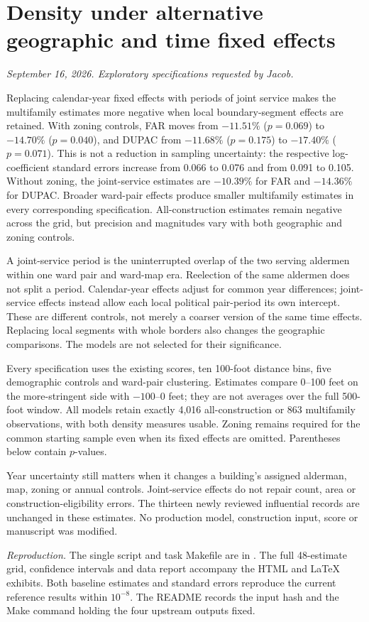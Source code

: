 \clearpage
\section*{Density under alternative geographic and time fixed effects}
\textit{September 16, 2026. Exploratory specifications requested by Jacob.}

Replacing calendar-year fixed effects with periods of joint service makes
the multifamily estimates more negative when local boundary-segment effects
are retained. With zoning controls, FAR moves from $-11.51\%$ ($p=0.069$)
to $-14.70\%$ ($p=0.040$), and DUPAC from $-11.68\%$ ($p=0.175$) to
$-17.40\%$ ($p=0.071$). This is not a reduction in sampling uncertainty:
the respective log-coefficient standard errors increase from 0.066 to
0.076 and from 0.091 to 0.105. Without zoning, the joint-service estimates
are $-10.39\%$ for FAR and $-14.36\%$ for DUPAC. Broader ward-pair effects
produce smaller multifamily estimates in every corresponding specification.
All-construction estimates remain negative across the grid, but precision
and magnitudes vary with both geographic and zoning controls.

A joint-service period is the uninterrupted overlap of the two serving
aldermen within one ward pair and ward-map era. Reelection of the same
aldermen does not split a period. Calendar-year effects adjust for common
year differences; joint-service effects instead allow each local political
pair-period its own intercept. These are different controls, not merely a
coarser version of the same time effects. Replacing local segments with
whole borders also changes the geographic comparisons. The models are not
selected for their significance.

Every specification uses the existing scores, ten 100-foot distance bins,
five demographic controls and ward-pair clustering. Estimates compare
0--100 feet on the more-stringent side with $-100$--0 feet; they are not
averages over the full 500-foot window. All models retain exactly 4,016
all-construction or 863 multifamily observations, with both density measures
usable. Zoning remains required for the common starting sample even when
its fixed effects are omitted. Parentheses below contain $p$-values.



\medskip
Year uncertainty still matters when it changes a building's assigned
alderman, map, zoning or annual controls. Joint-service effects do not repair
count, area or construction-eligibility errors. The thirteen newly reviewed
influential records are unchanged in these estimates. No production model,
construction input, score or manuscript was modified.

\textit{Reproduction.} The single script and task Makefile are in
. The full 48-estimate grid,
confidence intervals and data report accompany the HTML and LaTeX exhibits.
Both baseline estimates and standard errors reproduce the current reference
results within $10^{-8}$. The README records the input hash and the Make
command holding the four upstream outputs fixed.
